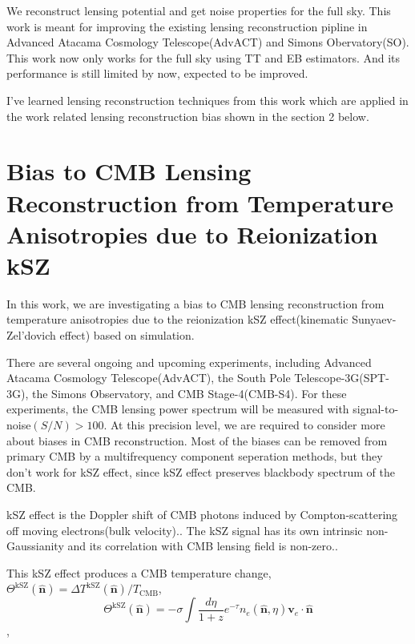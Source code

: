 \documentclass[12pt, notitlepage, onecolumn, amsmath, amssymb, aps]{revtex4-1}
\begin{document}
We reconstruct lensing potential and get noise properties for the full sky. This work is meant for improving the existing lensing reconstruction pipline in Advanced Atacama Cosmology Telescope(AdvACT) and Simons Obervatory(SO). This work now only works for the full sky using TT and EB estimators. And its performance is still limited by now, expected to be improved.

I've learned lensing reconstruction techniques from this work which are applied in the work related lensing reconstruction bias shown in the section 2 below.


\section{Bias to CMB Lensing Reconstruction from Temperature Anisotropies due to Reionization kSZ}
\label{sec:org093d799}
In this work, we are investigating a bias to CMB lensing reconstruction from temperature anisotropies due to the reionization kSZ effect(kinematic Sunyaev-Zel'dovich effect) based on simulation.

There are several ongoing and upcoming experiments, including Advanced Atacama Cosmology Telescope(AdvACT)\cite{Henderson:2015nzj}, the South Pole Telescope-3G(SPT-3G)\cite{Benson:2014qhw}, the Simons Observatory\cite{Ade:2018sbj}, and CMB Stage-4(CMB-S4)\cite{Abazajian:2016yjj}. For these experiments, the CMB lensing power spectrum will be measured with signal-to-noise\((S/N)>100\). At this precision level, we are required to consider more about biases in CMB reconstruction. Most of the biases can be removed from primary CMB by a multifrequency component seperation methods, but they don't work for kSZ effect, since kSZ effect preserves blackbody spectrum of the CMB.\cite{Smith:2009pn}

kSZ effect is the Doppler shift of CMB photons induced by Compton-scattering off moving electrons(bulk velocity).\cite{Ferraro:2017fac}. The kSZ signal has its own intrinsic non-Gaussianity and its correlation with CMB lensing field is non-zero.\cite{Smith:2016lnt}.

This kSZ effect produces a CMB temperature change, \(\Theta^{\mathrm{kSZ}}(\hat{\mathbf{n}})=\Delta T^{\mathrm{kSZ}}(\hat{\mathbf{n}}) / T_{\mathrm{CMB}}\),
\begin{equation}
  \Theta^{\mathrm{kSZ}}(\hat{\mathbf{n}})=-\sigma \int \frac{d \eta}{1+z} e^{-\tau} n_{e}(\hat{\mathbf{n}}, \eta) \mathbf{v}_{e} \cdot \hat{\mathbf{n}}
\end{equation} \cite{Ferraro:2017fac},
\end{document}
